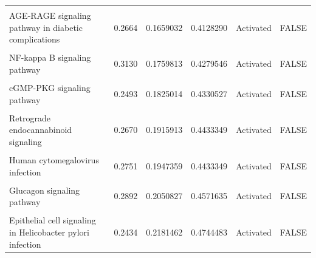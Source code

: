 \documentclass[9pt,a4paper,]{extarticle}
\begin{document}
\begin{table}
{\begin{tabular}[t]{lrrrll}
\cellcolor{gray!6}{Aldosterone synthesis and secretion} & \cellcolor{gray!6}{0.2538} & \cellcolor{gray!6}{0.1613727} & \cellcolor{gray!6}{0.4062796} & \cellcolor{gray!6}{Activated} & \cellcolor{gray!6}{FALSE}\\
\addlinespace
AGE-RAGE signaling pathway in diabetic complications & 0.2664 & 0.1659032 & 0.4128290 & Activated & FALSE\\
\cellcolor{gray!6}{Hippo signaling pathway - multiple species} & \cellcolor{gray!6}{-0.2509} & \cellcolor{gray!6}{0.1702716} & \cellcolor{gray!6}{0.4188290} & \cellcolor{gray!6}{Inhibited} & \cellcolor{gray!6}{FALSE}\\
NF-kappa B signaling pathway & 0.3130 & 0.1759813 & 0.4279546 & Activated & FALSE\\
\cellcolor{gray!6}{HIF-1 signaling pathway} & \cellcolor{gray!6}{-0.2512} & \cellcolor{gray!6}{0.1814779} & \cellcolor{gray!6}{0.4330527} & \cellcolor{gray!6}{Inhibited} & \cellcolor{gray!6}{FALSE}\\
cGMP-PKG signaling pathway & 0.2493 & 0.1825014 & 0.4330527 & Activated & FALSE\\
\addlinespace
\cellcolor{gray!6}{Platinum drug resistance} & \cellcolor{gray!6}{-0.2679} & \cellcolor{gray!6}{0.1841486} & \cellcolor{gray!6}{0.4330527} & \cellcolor{gray!6}{Inhibited} & \cellcolor{gray!6}{FALSE}\\
Retrograde endocannabinoid signaling & 0.2670 & 0.1915913 & 0.4433349 & Activated & FALSE\\
\cellcolor{gray!6}{MicroRNAs in cancer} & \cellcolor{gray!6}{0.2525} & \cellcolor{gray!6}{0.1929904} & \cellcolor{gray!6}{0.4433349} & \cellcolor{gray!6}{Activated} & \cellcolor{gray!6}{FALSE}\\
Human cytomegalovirus infection & 0.2751 & 0.1947359 & 0.4433349 & Activated & FALSE\\
\cellcolor{gray!6}{Pathways of neurodegeneration - multiple diseases} & \cellcolor{gray!6}{0.2776} & \cellcolor{gray!6}{0.2007178} & \cellcolor{gray!6}{0.4521433} & \cellcolor{gray!6}{Activated} & \cellcolor{gray!6}{FALSE}\\
\addlinespace
Glucagon signaling pathway & 0.2892 & 0.2050827 & 0.4571635 & Activated & FALSE\\
\cellcolor{gray!6}{PD-L1 expression and PD-1 checkpoint pathway in cancer} & \cellcolor{gray!6}{0.2843} & \cellcolor{gray!6}{0.2109040} & \cellcolor{gray!6}{0.4652934} & \cellcolor{gray!6}{Activated} & \cellcolor{gray!6}{FALSE}\\
Epithelial cell signaling in Helicobacter pylori infection & 0.2434 & 0.2181462 & 0.4744483 & Activated & FALSE\\

\end{tabular}}
\end{table}
\end{document}

